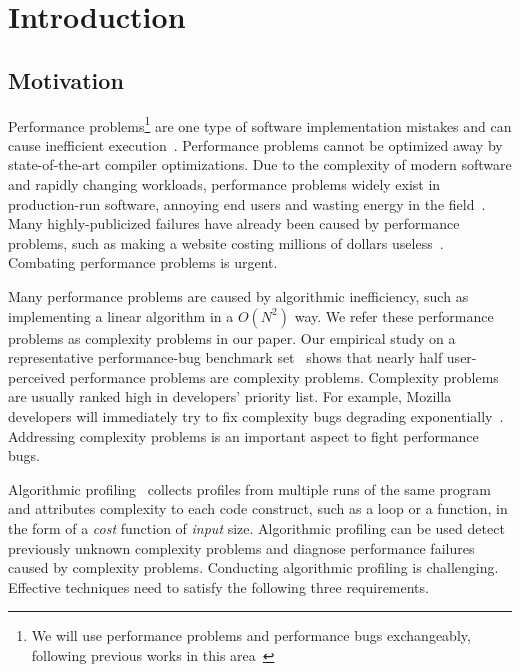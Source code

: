 \section{Introduction}
\label{sec:intro}

\subsection{Motivation}
\label{sec:motiv}

Performance problems\footnote{We will use performance problems and performance bugs exchangeably, 
following previous works in this area~\cite{SongOOPSLA2014,ldoctor}} 
are one type of software implementation mistakes
and can cause inefficient execution~\cite{PerfBug,perf.fse10,SongOOPSLA2014,ldoctor,Alabama}. 
Performance problems cannot be optimized away by state-of-the-art compiler optimizations.
Due to the complexity of modern software and rapidly changing workloads, 
performance problems widely exist in production-run software, 
annoying end users and wasting energy in the field~\cite{PerfBug,SongOOPSLA2014,ldoctor}. 
Many highly-publicized failures have already been caused by performance problems, 
such as making a website costing millions of dollars useless~\cite{ACA-health}.
Combating performance problems is urgent. 

Many performance problems are caused by algorithmic inefficiency, 
such as implementing a linear algorithm in a $O(N^2)$ way.
We refer these performance problems as complexity problems in our paper.
Our empirical study on a representative performance-bug 
benchmark set~\cite{PerfBug,SongOOPSLA2014} shows that 
nearly half user-perceived performance problems are complexity problems. 
Complexity problems are usually ranked high in developers' priority list. 
For example, Mozilla developers will immediately try to fix complexity bugs degrading exponentially~\cite{mozilla35294}. 
Addressing complexity problems is an important aspect to fight performance bugs. 


Algorithmic profiling~\cite{Aprof1,Aprof2,AlgoProf} collects profiles from multiple 
runs of the same program and attributes complexity to each code construct, such as a loop or a function,
in the form of a \textit{cost} function of \textit{input} size. 
Algorithmic profiling can be used detect previously unknown complexity problems and 
diagnose performance failures caused by complexity problems. 
Conducting algorithmic profiling is challenging. 
Effective techniques need to satisfy the following three requirements.

